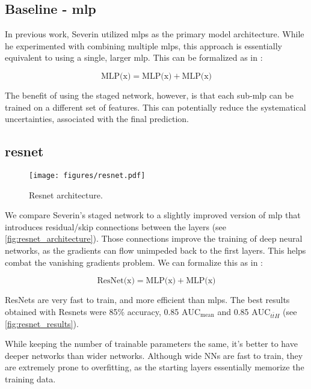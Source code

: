 \subsection[Baseline - mlp]{Baseline - \gls{mlp}}

In previous work, Severin utilized \glspl{mlp} as the primary model architecture.
While he experimented with combining multiple \glspl{mlp}, this approach is essentially equivalent to using a single,
larger \gls{mlp}. This can be formalized as in \cite{ft-transformer}:

$$
    \text{MLP(x)} = \text{MLP(x)} + \text{MLP(x)}
$$

The benefit of using the staged network, however, is that each sub-\gls{mlp} can be trained on a different set of
features. This can potentially reduce the systematical uncertainties, associated with the final prediction.



\subsection[resnet]{\gls{resnet}}

\begin{figure}[htbp]
    \centering
    \texttt{[image: figures/resnet.pdf]}
    \caption{Resnet architecture.}
    \label{fig:resnet_architecture}
\end{figure}

We compare Severin's staged network to a slightly improved version of \gls{mlp} that introduces residual/skip
connections between the layers (see \autoref{fig:resnet_architecture}).
Those connections improve the training of deep neural networks, as the gradients can flow unimpeded back to the first
layers. This helps combat the vanishing gradients problem. We can formalize this as in
\cite{ft-transformer}:

$$
    \text{ResNet(x)} = \text{MLP(x)} + \text{MLP(x)}
$$

ResNets are very fast to train, and more efficient than mlps. The best results obtained with Resnets were 85\% accuracy,
0.85 $\text{AUC}_\text{mean}$ and 0.85 $\text{AUC}_{t\bar{t}H}$ (see \autoref{fig:resnet_results}).

While keeping the number of trainable parameters the same, it's better to have deeper networks than wider networks.
Although wide NNs are fast to train, they are extremely prone to overfitting, as the starting layers essentially
memorize the training data.

